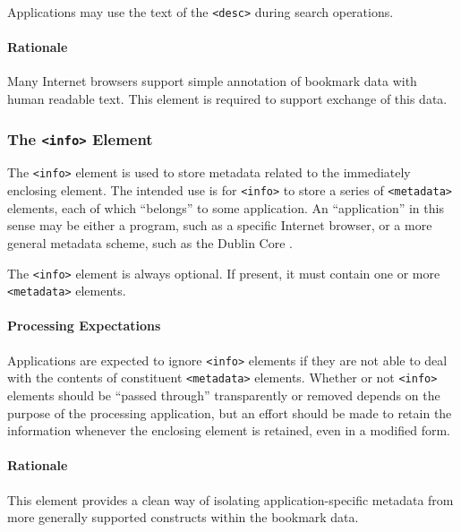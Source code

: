 \documentclass{howto}
\newcommand{\element}[1]{\texttt{<#1>}}
\begin{document}
        Applications may use the text of the \element{desc}
        during search operations.

      \paragraph*{Rationale}
        Many Internet browsers support simple annotation of bookmark
        data with human readable text.  This element is required to
        support exchange of this data.

    \subsubsection{The \element{info} Element
                   \label{element-info}}

      The \element{info} element is used to store metadata related to
      the immediately enclosing element.  The intended use is for
      \element{info} to store a series of \element{metadata} elements,
      each of which ``belongs'' to some application.  An
      ``application'' in this sense may be either a program, such as a
      specific Internet browser, or a more general metadata scheme,
      such as the Dublin Core \cite{dublin-core}.

      The \element{info} element is always optional.  If present, it
      must contain one or more \element{metadata} elements.

      \paragraph*{Processing Expectations}
        Applications are expected to ignore \element{info} elements if
        they are not able to deal with the contents of constituent
        \element{metadata} elements.  Whether or not \element{info}
        elements should be ``passed through'' transparently or removed
        depends on the purpose of the processing application, but an
        effort should be made to retain the information whenever the
        enclosing element is retained, even in a modified form.

      \paragraph*{Rationale}
        This element provides a clean way of isolating
        application-specific metadata from more generally supported
        constructs within the bookmark data.
\end{document}
